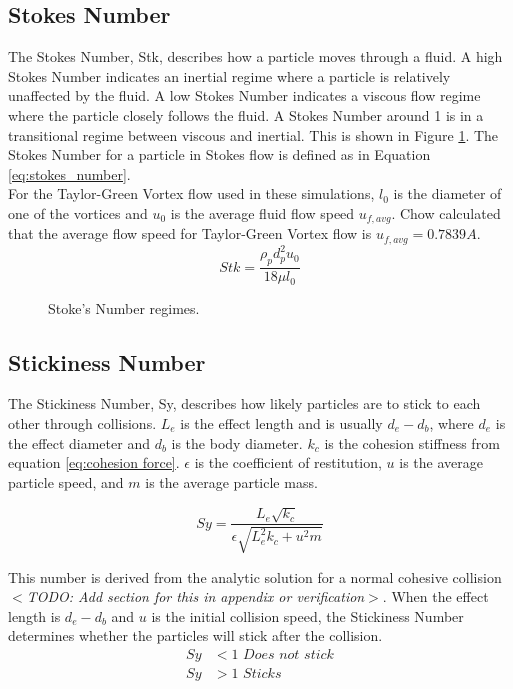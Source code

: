 \documentclass[10pt,a4paper,titlepage]{report}
\begin{document}
\subsection{Stokes Number}
The Stokes Number, Stk, describes how a particle moves through a fluid. A high Stokes Number indicates an inertial regime where a particle is relatively unaffected by the fluid. A low Stokes Number indicates a viscous flow regime where the particle closely follows the fluid. A Stokes Number around 1 is in a transitional regime between viscous and inertial. This is shown in Figure \ref{fig:stokes_number}. The Stokes Number for a particle in Stokes flow is defined as in Equation \ref{eq:stokes_number}\cite{achow}.
\\For the Taylor-Green Vortex flow used in these simulations, $l_0$ is the diameter of one of the vortices and $u_0$ is the average fluid flow speed $u_{f,avg}$. Chow\cite{achow} calculated that the average flow speed for Taylor-Green Vortex flow is $u_{f,avg} = 0.7839A$.
\begin{equation}
Stk = \dfrac{\rho_p d_p^2 u_0}{18 \mu l_0}
\label{eq:stokes_number}
\end{equation}
\begin{figure}[!htb]
\centering

\caption{Stoke's Number regimes.}
\label{fig:stokes_number}
\end{figure}
\subsection{Stickiness Number}
The Stickiness Number, Sy, describes how likely particles are to stick to each other through collisions. $L_e$ is the effect length and is usually $d_e - d_b$, where $d_e$ is the effect diameter and $d_b$ is the body diameter. $k_c$ is the cohesion stiffness from equation \ref{eq:cohesion force}. $\epsilon$ is the coefficient of restitution, $u$ is the average particle speed, and $m$ is the average particle mass.

\begin{equation}
Sy = \dfrac{L_e \sqrt{k_c}}{\epsilon \sqrt{L_e^2 k_c + u^2 m}}
\end{equation}

This number is derived from the analytic solution for a normal cohesive collision $<$\textit{TODO: Add section for this in appendix or verification}$>$. When the effect length is $d_e - d_b$ and $u$ is the initial collision speed, the Stickiness Number determines whether the particles will stick after the collision.
\begin{align*}
Sy &< 1 \textit{ Does not stick}
\\ Sy & > 1 \textit{ Sticks}
\end{align*}
\end{document}

